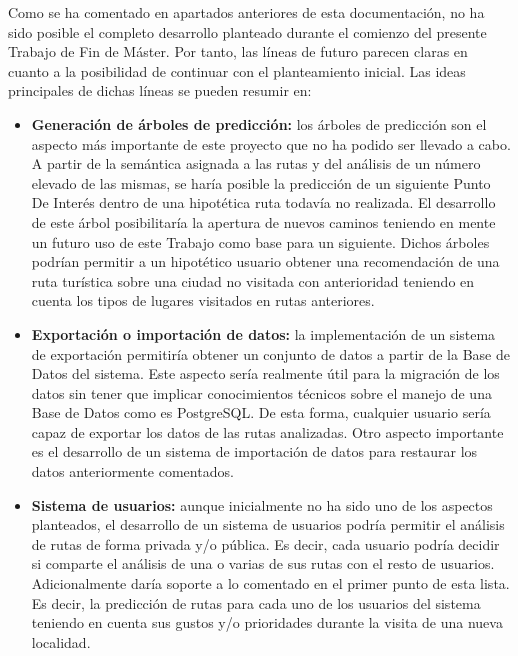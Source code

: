 Como se ha comentado en apartados anteriores de esta documentación, no ha sido posible el completo desarrollo planteado durante el comienzo del presente Trabajo de Fin de Máster. Por tanto, las líneas de futuro parecen claras en cuanto a la posibilidad de continuar con el planteamiento inicial. Las ideas principales de dichas líneas se pueden resumir en:

\begin{itemize}
	\item \textbf{Generación de árboles de predicción:} los árboles de predicción son el aspecto más importante de este proyecto que no ha podido ser llevado a cabo. A partir de la semántica asignada a las rutas y del análisis de un número elevado de las mismas, se haría posible la predicción de un siguiente Punto De Interés dentro de una hipotética ruta todavía no realizada. El desarrollo de este árbol posibilitaría la apertura de nuevos caminos teniendo en mente un futuro uso de este Trabajo como base para un siguiente.
	Dichos árboles podrían permitir a un hipotético usuario obtener una recomendación de una ruta turística sobre una ciudad no visitada con anterioridad teniendo en cuenta los tipos de lugares visitados en rutas anteriores.
	
	 \item \textbf{Exportación o importación de datos:} la implementación de un sistema de exportación permitiría obtener un conjunto de datos a partir de la Base de Datos del sistema. Este aspecto sería realmente útil para la migración de los datos sin tener que implicar conocimientos técnicos sobre el manejo de una Base de Datos como es PostgreSQL. De esta forma, cualquier usuario sería capaz de exportar los datos de las rutas analizadas.
	Otro aspecto importante es el desarrollo de un sistema de importación de datos para restaurar los datos anteriormente comentados.
	\item \textbf{Sistema de usuarios:} aunque inicialmente no ha sido uno de los aspectos planteados, el desarrollo de un sistema de usuarios podría permitir el análisis de rutas de forma privada y/o pública. Es decir, cada usuario podría decidir si comparte el análisis de una o varias de sus rutas con el resto de usuarios.
	Adicionalmente daría soporte a lo comentado en el primer punto de esta lista. Es decir, la predicción de rutas para cada uno de los usuarios del sistema teniendo en cuenta sus gustos y/o prioridades durante la visita de una nueva localidad.
\end{itemize}